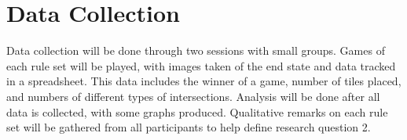 \documentclass{article}
\begin{document}
\section{Data Collection}
Data collection will be done through two sessions with small groups. Games of each rule set will be played, with images taken of the end state and data tracked in a spreadsheet. This data includes the winner of a game, number of tiles placed, and numbers of different types of intersections. Analysis will be done after all data is collected, with some graphs produced. Qualitative remarks on each rule set will be gathered from all participants to help define research question 2.




\end{document}
